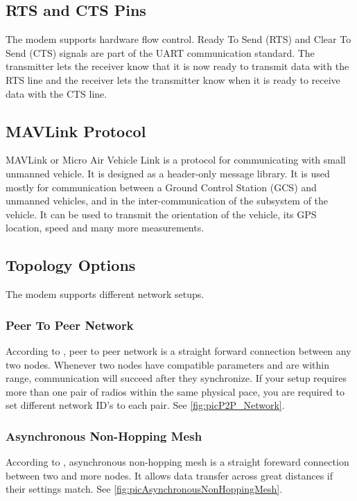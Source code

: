 \subsection{RTS and CTS Pins}
The modem supports hardware flow control. Ready To Send (RTS) and Clear To Send (CTS) signals are part of the UART communication standard. The transmitter lets the receiver know that it is now ready to transmit data with the RTS line and the receiver lets the transmitter know when it is ready to receive data with the CTS line.
%
%
\subsection{MAVLink Protocol}
MAVLink or Micro Air Vehicle Link is a protocol for communicating with small unmanned vehicle. It is designed as a header-only message library. It is used mostly for communication between a Ground Control Station (GCS) and unmanned vehicles, and in the inter-communication of the subsystem of the vehicle. It can be used to transmit the orientation of the vehicle, its GPS location, speed and many more measurements.
%
%
\subsection{Topology Options}
The modem supports different network setups.
%
\subsubsection{Peer To Peer Network}
%
According to \cite{RFD900x_Datasheet}, peer to peer network is a straight forward connection between any two nodes. Whenever  two  nodes  have compatible  parameters  and  are within range, communication will succeed after they synchronize. If your setup requires more than one pair of radios within the same physical pace, you are required to set different  network ID’s to each pair. See \autoref{fig:picP2P_Network}.
%
\subsubsection{Asynchronous Non-Hopping Mesh}
%
According to \cite{RFD900x_Datasheet}, asynchronous non-hopping mesh is a straight foreward connection between two and more nodes. It allows data transfer across great distances if their settings match. See \autoref{fig:picAsynchronousNonHoppingMesh}.
%
